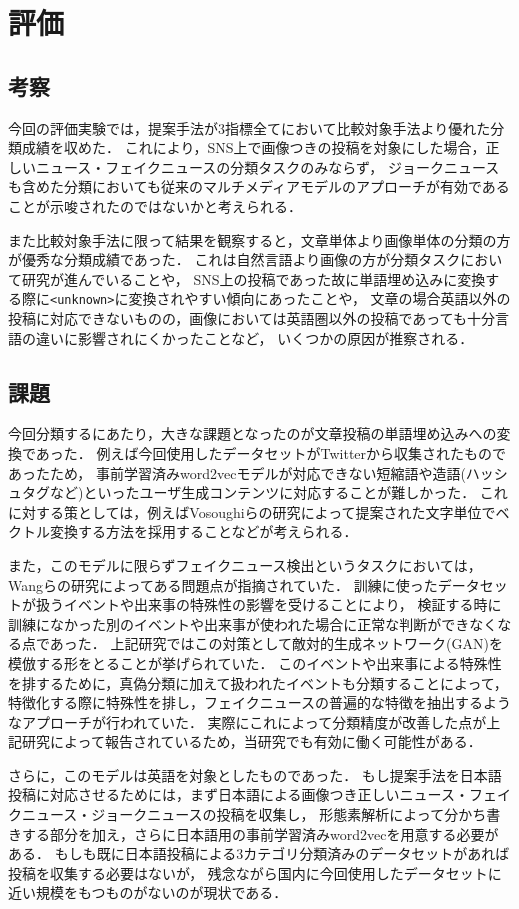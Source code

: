 \chapter{評価}

\section{考察}
今回の評価実験では，提案手法が3指標全てにおいて比較対象手法より優れた分類成績を収めた．
これにより，SNS上で画像つきの投稿を対象にした場合，正しいニュース・フェイクニュースの分類タスクのみならず，
ジョークニュースも含めた分類においても従来のマルチメディアモデルのアプローチが有効であることが示唆されたのではないかと考えられる．

また比較対象手法に限って結果を観察すると，文章単体より画像単体の分類の方が優秀な分類成績であった．
これは自然言語より画像の方が分類タスクにおいて研究が進んでいることや，
SNS上の投稿であった故に単語埋め込みに変換する際に\texttt{<unknown>}に変換されやすい傾向にあったことや，
文章の場合英語以外の投稿に対応できないものの，画像においては英語圏以外の投稿であっても十分言語の違いに影響されにくかったことなど，
いくつかの原因が推察される．

\section{課題}
今回分類するにあたり，大きな課題となったのが文章投稿の単語埋め込みへの変換であった．
例えば今回使用したデータセットがTwitterから収集されたものであったため，
事前学習済みword2vecモデルが対応できない短縮語や造語(ハッシュタグなど)といったユーザ生成コンテンツに対応することが難しかった．
これに対する策としては，例えばVosoughiらの研究\cite{Vosoughi:2016:TLT:2911451.2914762}によって提案された文字単位でベクトル変換する方法を採用することなどが考えられる．

また，このモデルに限らずフェイクニュース検出というタスクにおいては，Wangらの研究\cite{wang2018eann}によってある問題点が指摘されていた．
訓練に使ったデータセットが扱うイベントや出来事の特殊性の影響を受けることにより，
検証する時に訓練になかった別のイベントや出来事が使われた場合に正常な判断ができなくなる点であった．
上記研究ではこの対策として敵対的生成ネットワーク(GAN)を模倣する形をとることが挙げられていた．
このイベントや出来事による特殊性を排するために，真偽分類に加えて扱われたイベントも分類することによって，
特徴化する際に特殊性を排し，フェイクニュースの普遍的な特徴を抽出するようなアプローチが行われていた．
実際にこれによって分類精度が改善した点が上記研究によって報告されているため，当研究でも有効に働く可能性がある．

さらに，このモデルは英語を対象としたものであった．
もし提案手法を日本語投稿に対応させるためには，まず日本語による画像つき正しいニュース・フェイクニュース・ジョークニュースの投稿を収集し，
形態素解析によって分かち書きする部分を加え，さらに日本語用の事前学習済みword2vecを用意する必要がある．
もしも既に日本語投稿による3カテゴリ分類済みのデータセットがあれば投稿を収集する必要はないが，
残念ながら国内に今回使用したデータセットに近い規模をもつものがないのが現状である．

%